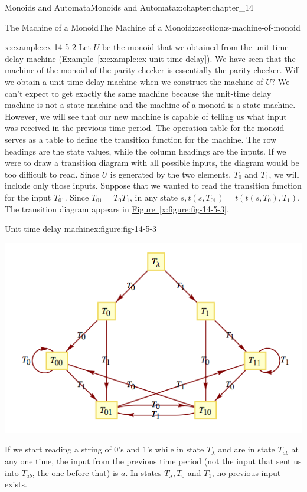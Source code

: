 \documentclass[oneside,10pt,]{book}
\newcommand{\xreffont}{\relax}
\numberwithin{equation}{section}
\begin{document}
\begin{chapterptx}{Monoids and Automata}{}{Monoids and Automata}{}{}{x:chapter:chapter_14}
\begin{sectionptx}{The Machine of a Monoid}{}{The Machine of a Monoid}{}{}{x:section:s-machine-of-monoid}
\begin{example}{}{x:example:ex-14-5-2}
Let \(U\) be the monoid that we obtained from the unit-time delay machine (\hyperref[x:example:ex-unit-time-delay]{Example~{\xreffont\ref{x:example:ex-unit-time-delay}}}). We have seen that the machine of the monoid of the parity checker is essentially the parity checker. Will we obtain a unit-time delay machine when we construct the machine of \(U\)? We can't expect to get exactly the same machine because the unit-time delay machine is not a state machine and the machine of a monoid is a state machine. However, we will see that our new machine is capable of telling us what input was received in the previous time period. The operation table for the monoid serves as a table to define the transition function for the machine. The row headings are the state values, while the column headings are the inputs. If we were to draw a transition diagram with all possible inputs, the diagram would be too difficult to read. Since \(U\) is generated by the two elements, \(T_0\) and \(T_1\), we will include only those inputs. Suppose that we wanted to read the transition function for the input \(T_{01}\). Since \(T_{01}=T_0T_1\), in any state \(s, t\left(s, T_{01}\right) = t\left(t\left(s, T_0\right), T_1\right).\) The transition diagram appears in \hyperref[x:figure:fig-14-5-3]{Figure~{\xreffont\ref{x:figure:fig-14-5-3}}}.%
\begin{figureptx}{Unit time delay machine}{x:figure:fig-14-5-3}{}%
\begin{image}{0.15}{0.7}{0.15}%
\includegraphics[width=\linewidth]{images/fig-14-5-3.png}
\end{image}%
\tcblower
\end{figureptx}%
If we start reading a string of 0's and 1's while in state \(T_{\lambda }\) and are in state \(T_{ab}\) at any one time, the input from the previous time period (not the input that sent us into \(T_{ab}\), the one before that) is \(a\). In states \(T_{\lambda }, T_0\) and \(T_1\), no previous input exists.%

\end{example}
\end{sectionptx}
\end{chapterptx}
\end{document}
